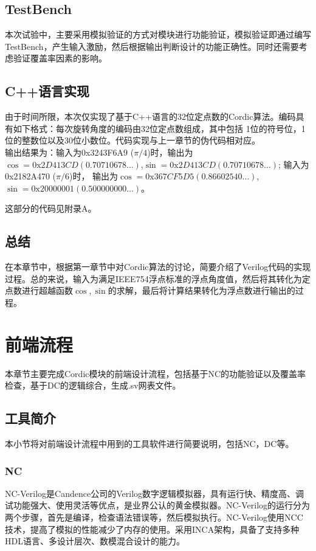 \documentclass[a4paper,12pt]{report}
\begin{document}
\section{TestBench}
本次试验中，主要采用模拟验证的方式对模块进行功能验证，模拟验证即通过编写TestBench，产生输入激励，然后根据输出判断设计的功能正确性。同时还需要考虑验证覆盖率因素的影响。

\section{C++语言实现}
由于时间所限，本次仅实现了基于C++语言的32位定点数的Cordic算法。编码具有如下格式：每次旋转角度的编码由32位定点数组成，其中包括
1位的符号位，1位的整数位以及30位小数位。代码实现与上一章节的伪代码相对应。\\
输出结果为：输入为0x3243F6A9 ($\pi / 4$)时，输出为$\cos = \mathrm{0x}2D413CD(0.70710678\dots)$,$\sin = \mathrm{0x}2D413CD(0.70710678\dots)$; 输入为0x2182A470 ($\pi / 6$)时， 输出为$\cos = \mathrm{0x}367CF5D5(0.86602540\dots)$,$\sin = \mathrm{0x}20000001(0.500000000\dots)$。

这部分的代码见附录A。
\section{总结}
在本章节中，根据第一章节中对Cordic算法的讨论，简要介绍了Verilog代码的实现过程。总的来说，输入为满足IEEE754浮点标准的浮点角度值，然后将其转化为定点数进行超越函数$\cos, \sin$的求解，最后将计算结果转化为浮点数进行输出的过程。

\chapter{前端流程}
本章节主要完成Cordic模块的前端设计流程，包括基于NC的功能验证以及覆盖率检查，基于DC的逻辑综合，生成.sv网表文件。
\section{工具简介}
本小节将对前端设计流程中用到的工具软件进行简要说明，包括NC，DC等。
\subsection{NC}
NC-Verilog是Candence公司的Verilog数字逻辑模拟器，具有运行快、精度高、调试功能强大、使用灵活等优点，是业界公认的黄金模拟器。NC-Verilog的运行分为两个步骤，首先是编译，检查语法错误等，然后模拟执行。NC-Verilog使用NCC技术，提高了模拟的性能减少了内存的使用。采用INCA架构，具备了支持多种HDL语言、多设计层次、数模混合设计的能力。
\end{document}
